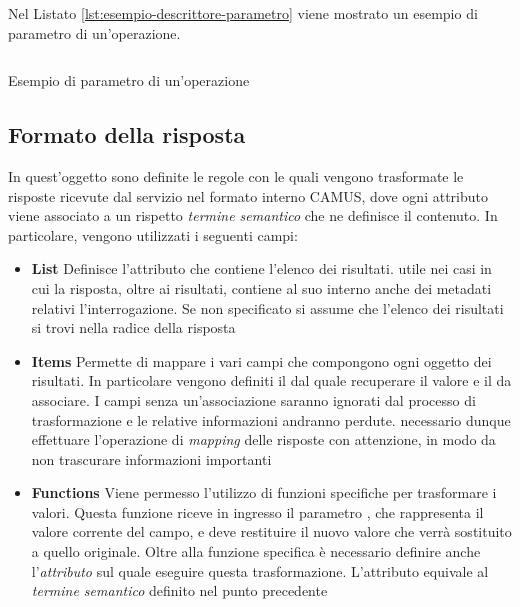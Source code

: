 Nel Listato \ref{lst:esempio-descrittore-parametro} viene mostrato un esempio di parametro di un'operazione.

\begin{listing}[H]
	\inputminted{json}{5-implementazione-backend/Codice/esempio_descrittore_parametro.json}
	\caption{Esempio di parametro di un'operazione}
	\label{lst:esempio-descrittore-parametro}
\end{listing}

\subsection{Formato della risposta\label{sec:descrittore-risposta}}

In quest'oggetto sono definite le regole con le quali vengono trasformate le risposte ricevute dal servizio nel formato interno CAMUS, dove ogni attributo viene associato a un rispetto \emph{termine semantico} che ne definisce il contenuto. In particolare, vengono utilizzati i seguenti campi:

\begin{itemize}
	\item \textbf{List}
	Definisce l'attributo che contiene l'elenco dei risultati. \upe utile nei casi in cui la risposta, oltre ai risultati, contiene al suo interno anche dei metadati relativi l'interrogazione. Se non specificato si assume che l'elenco dei risultati si trovi nella radice della risposta
	\item \textbf{Items}
	Permette di mappare i vari campi che compongono ogni oggetto dei risultati. In particolare vengono definiti il  dal quale recuperare il valore e il  da associare. I campi senza un'associazione saranno ignorati dal processo di trasformazione e le relative informazioni andranno perdute. \upe necessario dunque effettuare l'operazione di \emph{mapping} delle risposte con attenzione, in modo da non trascurare informazioni importanti
	\item \textbf{Functions}
	Viene permesso l'utilizzo di funzioni specifiche per trasformare i valori. Questa funzione riceve in ingresso il parametro , che rappresenta il valore corrente del campo, e deve restituire il nuovo valore che verrà sostituito a quello originale. Oltre alla funzione specifica è necessario definire anche l'\emph{attributo} sul quale eseguire questa trasformazione. L'attributo equivale al \emph{termine semantico} definito nel punto precedente
\end{itemize}

